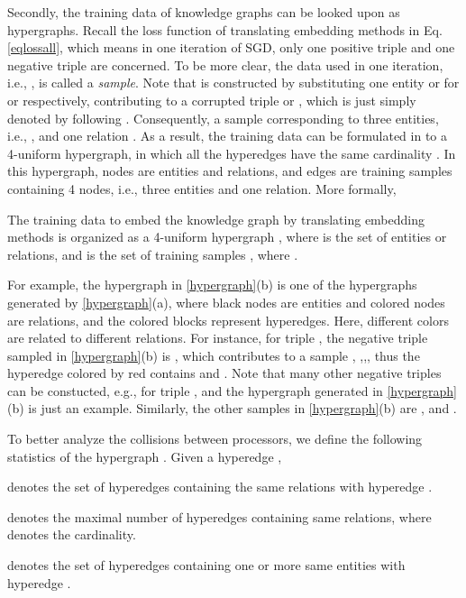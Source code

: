 \documentclass[sigconf]{acmart}
\begin{document}
Secondly, the training data of knowledge graphs can be looked upon as hypergraphs. 
Recall the loss function of translating embedding methods in Eq.\eqref{eqlossall}, which means in one iteration of  SGD, only one positive triple  and one negative triple  are concerned. To be more clear, the data used in one iteration, i.e., , is called a \textit{sample}. Note that  is constructed by substituting one entity  or  for  or  respectively, contributing to a corrupted triple  or , which is just simply denoted by  following \cite{bordes2013translating}. Consequently, a sample corresponding to three entities, i.e., , and one relation . As a result, the training data can be formulated in to a 4-uniform hypergraph, in which all the hyperedges have  the same cardinality . In this hypergraph, nodes are entities and relations, and edges are training samples containing 4 nodes, i.e., three entities and one relation. More formally, 
\begin{definition} 
The training data to embed the knowledge graph  by translating embedding methods is organized as a 4-uniform hypergraph , where  is the set of entities or relations, and  is the set of training samples , where .
\end{definition}

For example, the hypergraph in \figurename \ref{hypergraph}(b) is one of the hypergraphs generated by \figurename \ref{hypergraph}(a), where black nodes are entities and colored nodes are relations, and the colored blocks represent hyperedges. Here, different colors are related to different relations. 
For instance, for triple , the negative triple sampled in \figurename \ref{hypergraph}(b)  is  , which contributes to a sample , ,,, thus the hyperedge colored by red contains  and . Note that many other negative triples can be constucted, e.g.,  for triple , and the hypergraph generated in  \figurename \ref{hypergraph}(b) is just an example. 
Similarly, the other samples in \figurename \ref{hypergraph}(b) are ,  and .

To better analyze the collisions between processors, we define the following statistics of the hypergraph  . Given a hyperedge ,

denotes the set of hyperedges containing the same relations with hyperedge . 

denotes the maximal number of  hyperedges containing same relations, where  denotes the cardinality.

denotes the set of hyperedges containing one or more same entities with hyperedge . 
\end{document}
